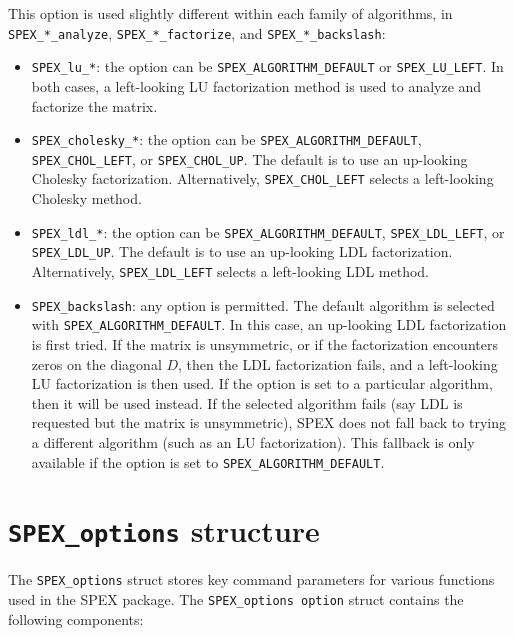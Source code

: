 \documentclass[12pt,oneside]{book}
\theoremstyle{definition}
\begin{document}
This option is used slightly different within each family of algorithms, in \verb'SPEX_*_analyze', \verb'SPEX_*_factorize', and \verb'SPEX_*_backslash':

\begin{itemize}

\item \verb'SPEX_lu_*':  the option can be
    \verb'SPEX_ALGORITHM_DEFAULT' or \verb'SPEX_LU_LEFT'.
    In both cases, a left-looking LU factorization method
    is used to analyze and factorize the matrix.

\item \verb'SPEX_cholesky_*':  the option can be 
\verb'SPEX_ALGORITHM_DEFAULT', \verb'SPEX_CHOL_LEFT',
or \verb'SPEX_CHOL_UP'.  The default is to use
an up-looking Cholesky factorization.  Alternatively,
\verb'SPEX_CHOL_LEFT' selects a left-looking Cholesky method.

\item \verb'SPEX_ldl_*':  the option can be 
\verb'SPEX_ALGORITHM_DEFAULT', \verb'SPEX_LDL_LEFT',
or \verb'SPEX_LDL_UP'.  The default is to use
an up-looking LDL factorization.  Alternatively,
\verb'SPEX_LDL_LEFT' selects a left-looking LDL method.

\item \verb'SPEX_backslash':  any option is permitted.
The default algorithm is selected with 
\verb'SPEX_ALGORITHM_DEFAULT'.  In this case, an up-looking
LDL factorization is first tried.  If the matrix is unsymmetric,
or if the factorization encounters zeros on the diagonal $D$, then the LDL factorization fails, and a left-looking LU factorization is then used.
If the option is set to a particular algorithm, then it will be used instead.  If the selected algorithm fails (say LDL is requested but the matrix is unsymmetric), SPEX does not fall back to trying a different algorithm (such as an LU factorization).  This fallback is only available if the
option is set to \verb'SPEX_ALGORITHM_DEFAULT'.

\end{itemize}

\section{\texttt{SPEX\_options} structure} \label{ss:SPEX_options_struct}
The \verb|SPEX_options| struct stores key command parameters for various
functions used in the SPEX package. The \verb|SPEX_options option| struct
contains the following components:
\end{document}
